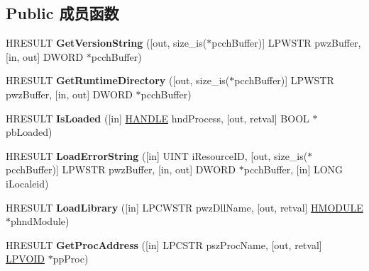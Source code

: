 \subsection*{Public 成员函数}
\begin{DoxyCompactItemize}
\item 
\mbox{\label{interface_i_c_l_r_runtime_info_aeb5b3d22fd003afeb1ec91f4ab80ef60}} 
H\+R\+E\+S\+U\+LT {\bfseries Get\+Version\+String} (\mbox{[}out, size\+\_\+is($\ast$pcch\+Buffer)\mbox{]} L\+P\+W\+S\+TR pwz\+Buffer, \mbox{[}in, out\mbox{]} D\+W\+O\+RD $\ast$pcch\+Buffer)
\item 
\mbox{\label{interface_i_c_l_r_runtime_info_adf4d82eb6be5eb55b842324637ae21f1}} 
H\+R\+E\+S\+U\+LT {\bfseries Get\+Runtime\+Directory} (\mbox{[}out, size\+\_\+is($\ast$pcch\+Buffer)\mbox{]} L\+P\+W\+S\+TR pwz\+Buffer, \mbox{[}in, out\mbox{]} D\+W\+O\+RD $\ast$pcch\+Buffer)
\item 
\mbox{\label{interface_i_c_l_r_runtime_info_aa26cd0b8147fd3e33952c52d0559afa9}} 
H\+R\+E\+S\+U\+LT {\bfseries Is\+Loaded} (\mbox{[}in\mbox{]} \hyperlink{interfacevoid}{H\+A\+N\+D\+LE} hnd\+Process, \mbox{[}out, retval\mbox{]} B\+O\+OL $\ast$pb\+Loaded)
\item 
\mbox{\label{interface_i_c_l_r_runtime_info_a927d96caacc244a00779d9656ccefa07}} 
H\+R\+E\+S\+U\+LT {\bfseries Load\+Error\+String} (\mbox{[}in\mbox{]} U\+I\+NT i\+Resource\+ID, \mbox{[}out, size\+\_\+is($\ast$pcch\+Buffer)\mbox{]} L\+P\+W\+S\+TR pwz\+Buffer, \mbox{[}in, out\mbox{]} D\+W\+O\+RD $\ast$pcch\+Buffer, \mbox{[}in\mbox{]} L\+O\+NG i\+Localeid)
\item 
\mbox{\label{interface_i_c_l_r_runtime_info_a09edc4f387ebd8c2b72d0168755a634a}} 
H\+R\+E\+S\+U\+LT {\bfseries Load\+Library} (\mbox{[}in\mbox{]} L\+P\+C\+W\+S\+TR pwz\+Dll\+Name, \mbox{[}out, retval\mbox{]} \hyperlink{interfacevoid}{H\+M\+O\+D\+U\+LE} $\ast$phnd\+Module)
\item 
\mbox{\label{interface_i_c_l_r_runtime_info_a916c0a43e0203cf0bbac1c2446762ebb}} 
H\+R\+E\+S\+U\+LT {\bfseries Get\+Proc\+Address} (\mbox{[}in\mbox{]} L\+P\+C\+S\+TR psz\+Proc\+Name, \mbox{[}out, retval\mbox{]} \hyperlink{interfacevoid}{L\+P\+V\+O\+ID} $\ast$pp\+Proc)

\end{DoxyCompactItemize}
